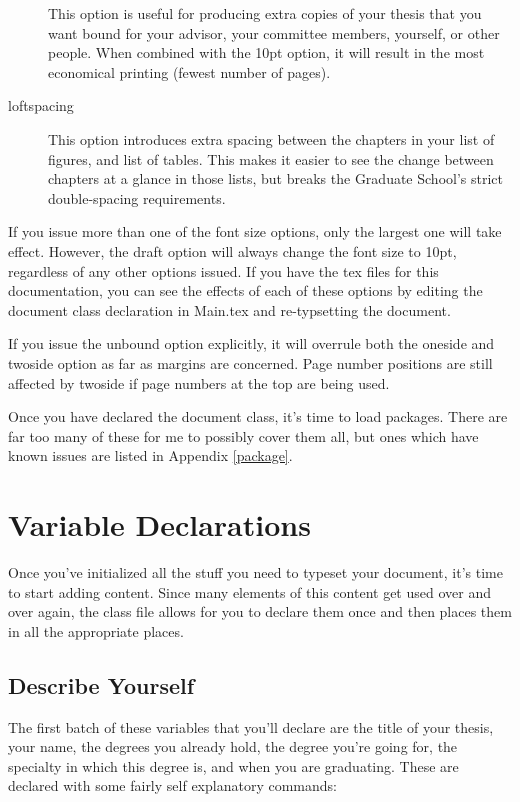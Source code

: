 \begin{description}
{This option is useful for producing extra copies of your thesis that you want bound for your advisor, your committee members, yourself, or other people.  When combined with the 10pt option, it will result in the most economical printing (fewest number of pages).}
\item[loftspacing]{This option introduces extra spacing between the chapters in your list of figures, and list of tables.  This makes it easier to see the change between chapters at a glance in those lists, but breaks the Graduate School’s strict double-spacing requirements.}
\end{description}
If you issue more than one of the font size options, only the largest one will take effect.  However, the draft option will always change the font size to 10pt, regardless of any other options issued.  If you have the tex files for this documentation, you can see the effects of each of these options by editing the document class declaration in Main.tex and re-typsetting the document.

If you issue the unbound option explicitly, it will overrule both the oneside and twoside option as far as margins are concerned.  Page number positions are still affected by twoside if page numbers at the top are being used.

Once you have declared the document class, it's time to load packages.  There are far too many of these for me to possibly cover them all, but ones which have known issues are listed in Appendix \ref{package}.

\section{Variable Declarations}

Once you've initialized all the stuff you need to typeset your document, it's time to start adding content.  Since many elements of this content get used over and over again, the class file allows for you to declare them once and then places them in all the appropriate places.

\subsection{Describe Yourself}\label{self}
The first batch of these variables that you'll declare are the title of your thesis, your name, the degrees you already hold, the degree you're going for, the specialty in which this degree is, and when you are graduating.  These are declared with some fairly self explanatory commands:

